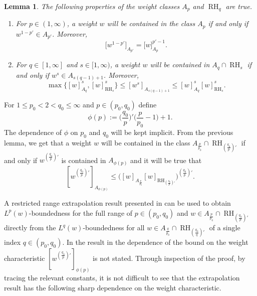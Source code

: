 \documentclass[11pt,reqno]{amsart}
\theoremstyle{plain} %
\newtheorem{lemma}[equation]{Lemma}
\newcommand{\1}{ \mathbbm{1}}   %
\theoremstyle{definition}
\theoremstyle{remark}
\numberwithin{equation}{section}
\begin{document}
\begin{lemma}
  \label{lem:WeightProperties}
  The following properties of the weight classes $A_{p}$ and $\operatorname{RH}_{q}$ are true.
  \begin{enumerate}
  \item[(i)] For $p \in (1,\infty)$, a weight $w$ will be contained in
    the class $A_{p}$ if and only if $w^{1 - p'} \in A_{p'}$. Moreover,
    \begin{equation*}
      \big[w^{1-p'}\big]_{A_{p'}} = \big[w\big]^{p' - 1}_{A_{p}}.
    \end{equation*}
  \item[(ii)] For $q \in [1,\infty]$ and $s \in [1,\infty)$, a weight
    $w$ will be contained in $A_{q} \cap \operatorname{RH}_{s}$ if and only if $w^{s}
    \in A_{s(q - 1) + 1}$. Moreover,
    \begin{equation}
    \label{eq:aqrh}
      \max\{[w]^{s}_{A_{q}} , [w]^{s}_{\operatorname{RH}_{s}}\} \le [w^{s}]_{A_{s(q - 1) + 1}}    
      \leq [w]^{s}_{A_{q}} [w]^{s}_{\operatorname{RH}_{s}}.
    \end{equation} 

  \end{enumerate}
\end{lemma}

For $1\leq p_{0} < 2 < q_{0} \leq \infty$ and  $p \in (p_{0},q_{0})$ define
$$
\phi(p) := \Big(\frac{q_{0}}{p}\Big)' \Big(\frac{p}{p_{0}} - 1\Big) + 1.
$$
The dependence of $\phi$ on $p_{0}$ and $q_{0}$ will be kept
implicit. From the previous lemma, we get that a weight $w$ will be contained in the class
$A_{\frac{p}{p_{0}}} \cap \operatorname{RH}_{(\frac{q_{0}}{p})'}$ if and only if
$w^{(\frac{q_{0}}{p})'}$ is contained in $A_{\phi(p)}$ and it will be
true that
\begin{equation}
  \label{eqtn:WeightProperty}
[w^{(\frac{q_{0}}{p})'}]_{A_{\phi(p)}} \leq
\Big([w]_{A_{\frac{p}{p_{0}}}}  [w]_{\operatorname{RH}_{(\frac{q_{0}}{p})'}}\Big)^{(\frac{q_{0}}{p})'}.
\end{equation}


A restricted range extrapolation result presented in \cite{AuscherMartellIGeneral} can be used to obtain
$L^{p}(w)$-boundedness for the full range of $p \in (p_{0},q_{0})$ and
$w \in A_{\frac{p}{p_{0}}} \cap \operatorname{RH}_{(\frac{q_{0}}{p})'}$ directly
from the $L^{q}(w)$-boundedness for all $w \in A_{\frac{q}{p_{0}}} \cap \operatorname{RH}_{(\frac{q_{0}}{q})'}$ of a single index
$q \in (p_{0},q_{0})$. In the result in \cite{AuscherMartellIGeneral}
the dependence of the bound on the weight characteristic
$[w^{(\frac{q_{0}}{p})'}]_{\phi(p)}$ is not stated. Through 
inspection of the proof, by tracing the relevant constants, it is not difficult to see that the
extrapolation result has the following sharp dependence on the
weight characteristic. 
\end{document}

